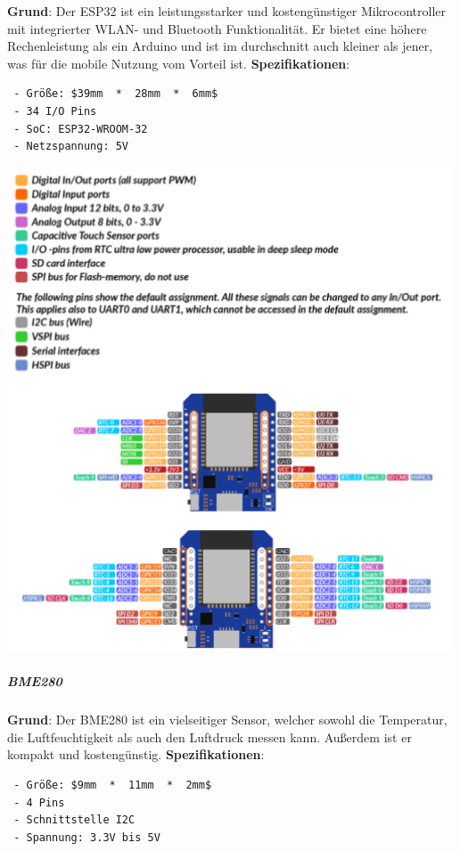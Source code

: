 \documentclass[
    headings=optiontotocandhead,%
    twoside,
    numbers=noenddot,%
    12pt, %
    titlepage, %
    parskip=full, %
    listof=leveldown, 
    numbers=noenddot, %
    a4paper,DIV=14,
    BCOR=15mm,
]{scrbook}
\let\origfigure=\figure
\let\endorigfigure=\endfigure
\renewenvironment{figure}[1][]{%
   \origfigure[H]
}{%
   \endorigfigure
}
\begin{document}
\textbf{Grund}: Der ESP32 ist ein leistungsstarker und kostengünstiger
Mikrocontroller mit integrierter WLAN- und Bluetooth Funktionalität. Er
bietet eine höhere Rechenleistung als ein Arduino und ist im
durchschnitt auch kleiner als jener, was für die mobile Nutzung vom
Vorteil ist. \textbf{Spezifikationen}:

\begin{lstlisting}
 - Größe: $39mm  *  28mm  *  6mm$
 - 34 I/O Pins
 - SoC: ESP32-WROOM-32
 - Netzspannung: 5V
\end{lstlisting}

\begin{figure}
\centering
\includegraphics[width=5.20833in,height=\textheight]{img/Kampl/ESP32-Pins.png}
\caption{ESP32-Pins {[}\protect\hyperlink{ref-ESP32-Datenblatt}{18}{]}}
\end{figure}

\hypertarget{bme280}{%
\subparagraph{BME280}\label{bme280}}

\textbf{Grund}: Der BME280 ist ein vielseitiger Sensor, welcher sowohl
die Temperatur, die Luftfeuchtigkeit als auch den Luftdruck messen kann.
Außerdem ist er kompakt und kostengünstig. \textbf{Spezifikationen}:

\begin{lstlisting}
 - Größe: $9mm  *  11mm  *  2mm$
 - 4 Pins
 - Schnittstelle I2C
 - Spannung: 3.3V bis 5V
\end{lstlisting}
\end{document}
